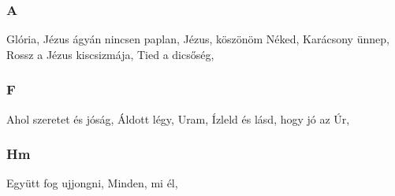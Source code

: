 \begin{multicols}{2}
\begin{minipage}{\textwidth}
\subsubsection*{A}
Glória, \pageref{GlC3B3ria}\newline
Jézus ágyán nincsen paplan, \pageref{JC3A9zusC3A1gyC3A1nnincsenpaplan}\newline
Jézus, köszönöm Néked, \pageref{JC3A9zus2CkC3B6szC3B6nC3B6mNC3A9ked}\newline
Karácsony ünnep, \pageref{KarC3A1csonyC3BCnnep}\newline
Rossz a Jézus kiscsizmája, \pageref{RosszaJC3A9zuskiscsizmC3A1ja}\newline
Tied a dicsőség, \pageref{TiedadicsC591sC3A9g}\newline

\end{minipage}
\begin{minipage}{\textwidth}
\subsubsection*{F}
Ahol szeretet és jóság, \pageref{AholszeretetC3A9sjC3B3sC3A1g}\newline
Áldott légy, Uram, \pageref{C381ldottlC3A9gy2CUram}\newline
Ízleld és lásd, hogy jó az Úr, \pageref{C38DzleldC3A9slC3A1sd2ChogyjC3B3azC39Ar}\newline

\end{minipage}
\begin{minipage}{\textwidth}
\subsubsection*{Hm}
Együtt fog ujjongni, \pageref{EgyC3BCttfogujjongni}\newline
Minden, mi él, \pageref{Minden2CmiC3A9l}\newline

\end{minipage}
\end{multicols}
